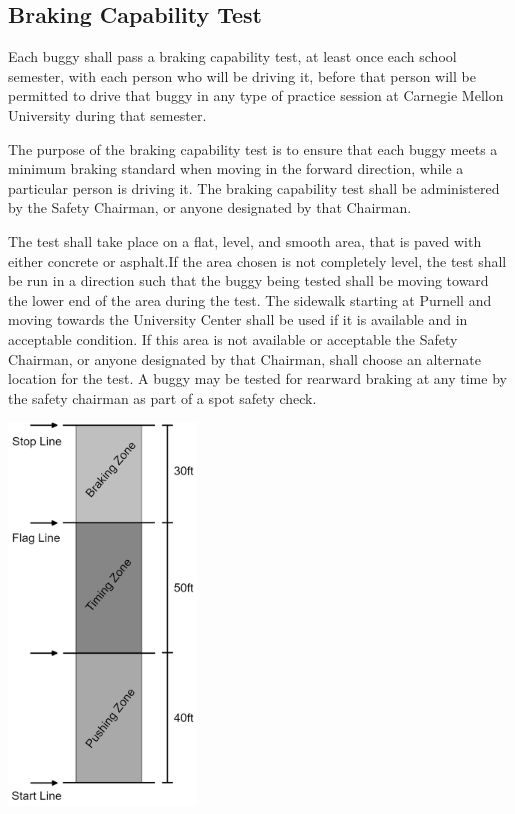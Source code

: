 \subsection{Braking Capability Test}

	Each buggy shall pass a braking capability test, at least once each school semester, with each person who will be driving it, before that person will be permitted to drive that buggy in any type of practice session at
	Carnegie Mellon University during that semester. 
	
	The purpose of the braking capability test is to ensure that each buggy meets a minimum braking standard when moving in the forward direction, while a particular person is driving it.  The braking capability test shall be administered by the Safety Chairman, or anyone designated by that Chairman.

	The test shall take place on a flat, level, and smooth area, that is paved with either concrete or asphalt.If the area chosen is not completely level, the test shall be run in a direction such that the buggy being tested shall be moving toward the lower end of the area during the test. The sidewalk starting at Purnell and moving towards the University Center shall be used if it is available and in acceptable condition. If this area is not available or acceptable the Safety Chairman, or anyone designated by that Chairman, shall choose an alternate location for the test. A buggy may be tested for rearward braking at any time by the safety chairman as part of a spot safety check.


	\begin{center}
		\includegraphics[height=4in]{assets/Buggy-Brake-Test-gs.png}
	\end{center}
	
